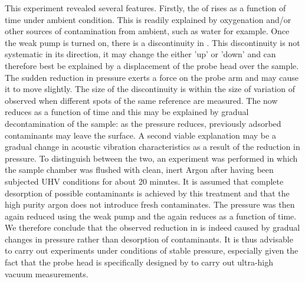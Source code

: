 This experiment revealed several features. Firstly, the \cpd{} of \hopg{} rises as a function of time under ambient condition. This is readily explained by oxygenation and/or other sources of contamination from ambient, such as water for example. Once the weak pump is turned on, there is a discontinuity in \cpd{}. This discontinuity is not systematic in its direction, it may change the \cpd{} either 'up' or 'down' and can therefore best be explained by a displacement of the probe head over the sample. The sudden reduction in pressure exerts a force on the probe arm and may cause it to move slightly. The size of the discontinuity is within the size of variation of \cpd{} observed when different spots of the same reference are measured. The \cpd{} now reduces as a function of time and this may be explained by gradual decontamination of the sample: as the pressure reduces, previously adsorbed contaminants may leave the surface. A second viable explanation may be a gradual change in acoustic vibration characteristics as a result of the reduction in pressure. To distinguish between the two, an experiment was performed in which the sample chamber was flushed with clean, inert Argon after having been subjected UHV conditions for about 20 minutes. It is assumed that complete desorption of possible contaminants is achieved by this treatment and that the high purity argon does not introduce fresh contaminates. The pressure was then again reduced using the weak pump and the \cpd{} again reduces as a function of time. We therefore conclude that the observed reduction in \cpd{} is indeed caused by gradual changes in pressure rather than desorption of contaminants. It is thus advisable to carry out \cpd{} experiments under conditions of stable pressure, especially given the fact that the probe head is specifically designed by \McA{} to carry out ultra-high vacuum \cpd{} measurements. 
